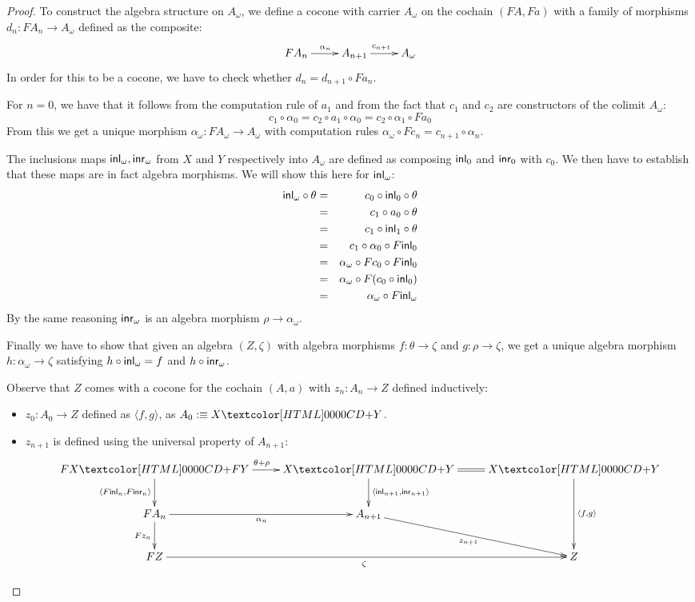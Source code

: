 \begin{proof}
  To construct the algebra structure on $A_{\omega}$, we define a
  cocone with carrier $A_{\omega}$ on the cochain $(FA, Fa)$ with a
  family of morphisms $d_n : FA_n \to A_{\omega}$ defined as the
  composite:
  $$
  \xymatrix{
    FA_n \ar[r]^{\alpha_n}
    &A_{n+1}
    \ar[r]^{c_{n+1}}
    &A_{\omega}
  }
  $$
  In order for this to be a cocone, we have to check whether
  $d_n = d_{n+1} \circ F a_n$.

  For $n = 0$, we have that it follows from the computation rule of
  $a_1$ and from the fact that $c_1$ and $c_2$ are constructors of the
  colimit $A_{\omega}$:
  $$
  c_1 \circ \alpha_0 = c_2 \circ a_1 \circ \alpha_0 = c_2 \circ \alpha_1 \circ Fa_0
  $$
  From this we get a unique morphism
  $\alpha_{\omega} : FA_{\omega} \to A_{\omega}$ with computation
  rules $\alpha_{\omega} \circ Fc_n = c_{n+1} \circ \alpha_n$.

  The inclusions maps $\inln{\omega}, \inrn{\omega}$ from $X$ and $Y$
  respectively into $A_{\omega}$ are defined as composing $\inln{0}$
  and $\inrn{0}$ with $c_0$. We then have to establish that these maps
  are in fact algebra morphisms. We will show this here for
  $\inln{\omega}$:
  \begin{align*}
    \inln{\omega} \circ \theta &=& c_0 \circ \inln{0} \circ \theta \\
    &=& c_1 \circ a_0 \circ \theta \\
    &=& c_1 \circ \inln{1} \circ \theta \\
    &=& c_1 \circ \alpha_0 \circ F \inln{0} \\
    &=&\alpha_{\omega} \circ F c_0 \circ F \inln{0} \\
    &=&\alpha_{\omega} \circ F (c_0 \circ \inln{0}) \\
    &=&\alpha_{\omega} \circ F \inln{\omega}
  \end{align*}
  By the same reasoning $\inr_{\omega}$ is an algebra morphism
  $\rho \to \alpha_{\omega}$.

  Finally we have to show that given an algebra $(Z,\zeta)$ with
  algebra morphisms $f : \theta \to \zeta$ and $g : \rho \to \zeta$,
  we get a unique algebra morphism $h : \alpha_{\omega} \to \zeta$
  satisfying $h \circ \inln{\omega} = f$ and $h \circ \inrn{\omega}$.

  Observe that $Z$ comes with a cocone for the cochain $(A,a)$ with
  $z_n : A_n \to Z$ defined inductively:
  \begin{itemize}
  \item $z_0  : A_0 \to Z$ defined as $\langle f , g \rangle$, as $A_0 \ddefeq \coproduct{X}{Y}$.
  \item $z_{n+1}$ is defined using the universal property of
    $A_{n+1}$:
    $$
    \xymatrix{
      \coproduct{FX}{FY} \ar[r]^{\theta + \rho} \ar[d]_{\langle F \inln{n} , F \inrn{n} \rangle} 
      &\coproduct{X}{Y} \ar[d]^{\langle \inln{n+1} , \inrn{n+1} \rangle} \ar@{=}[r]
      &\coproduct{X}{Y} \ar[dd]^{\langle f , g \rangle} \\
      FA_n \ar[r]_{\alpha_n} \ar[d]_{F z_n}
      &A_{n+1} \ar[dr]_{z_{n+1}}
      \\
      FZ \ar[rr]_{\zeta}
      &&Z
    }
    $$
  \end{itemize}


\end{proof}
